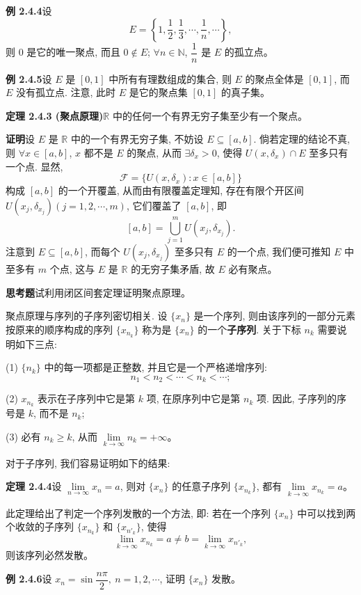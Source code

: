 \documentclass[UTF8, 12pt, fontset=fandol, oneside]{ctexart}
\begin{document}
\noindent\textbf{例 2.4.4}\quad 设
\[
  E=\left\{1,\frac12,\frac13,\cdots,\frac1n,\cdots\right\},
\]
则 $0$ 是它的唯一聚点, 而且 $0\notin E$; $\forall n\in\mathbb{N}$, $\dfrac1n$ 是 $E$ 的孤立点。

\noindent\textbf{例 2.4.5}\quad 设 $E$ 是 $[0,1]$ 中所有有理数组成的集合, 则 $E$ 的聚点全体是 $[0,1]$, 而 $E$ 没有孤立点. 注意, 此时 $E$ 是它的聚点集 $[0,1]$ 的真子集。

\noindent\textbf{定理 2.4.3 (聚点原理)}\quad $\mathbb{R}$ 中的任何一个有界无穷子集至少有一个聚点。

\noindent\textbf{证明}\quad 设 $E$ 是 $\mathbb{R}$ 中的一个有界无穷子集, 不妨设 $E\subseteq[a,b]$. 倘若定理的结论不真, 则 $\forall x\in[a,b]$, $x$ 都不是 $E$ 的聚点, 从而 $\exists\delta_x>0$, 使得 $U(x,\delta_x)\cap E$ 至多只有一个点. 显然,
\[
  \mathcal{F}=\{U(x,\delta_x):x\in[a,b]\}
\]
构成 $[a,b]$ 的一个开覆盖, 从而由有限覆盖定理知, 存在有限个开区间 $U(x_j,\delta_{x_j})(j=1,2,\cdots,m)$, 它们覆盖了 $[a,b]$, 即
\[
  [a,b]=\bigcup_{j=1}^m U(x_j,\delta_{x_j}).
\]
注意到 $E\subseteq[a,b]$, 而每个 $U(x_j,\delta_{x_j})$ 至多只有 $E$ 的一个点, 我们便可推知 $E$ 中至多有 $m$ 个点, 这与 $E$ 是 $\mathbb{R}$ 的无穷子集矛盾, 故 $E$ 必有聚点。

\noindent\textbf{思考题}\quad 试利用闭区间套定理证明聚点原理。

聚点原理与序列的子序列密切相关. 设 $\{x_n\}$ 是一个序列, 则由该序列的一部分元素按原来的顺序构成的序列 $\{x_{n_k}\}$ 称为是 $\{x_n\}$ 的一个\textbf{子序列}. 关于下标 $n_k$ 需要说明如下三点:

(1) $\{n_k\}$ 中的每一项都是正整数, 并且它是一个严格递增序列:
\[
  n_1<n_2<\cdots<n_k<\cdots;
\]

(2) $x_{n_k}$ 表示在子序列中它是第 $k$ 项, 在原序列中它是第 $n_k$ 项. 因此, 子序列的序号是 $k$, 而不是 $n_k$;

(3) 必有 $n_k\geqslant k$, 从而 $\lim\limits_{k\to\infty}n_k=+\infty$。

对于子序列, 我们容易证明如下的结果:

\noindent\textbf{定理 2.4.4}\quad 设 $\lim\limits_{n\to\infty}x_n=a$, 则对 $\{x_n\}$ 的任意子序列 $\{x_{n_k}\}$, 都有 $\lim\limits_{k\to\infty}x_{n_k}=a$。

此定理给出了判定一个序列发散的一个方法, 即: 若在一个序列 $\{x_n\}$ 中可以找到两个收敛的子序列 $\{x_{n_k}\}$ 和 $\{x_{n'_k}\}$, 使得
\[
  \lim_{k\to\infty}x_{n_k}=a\ne b=\lim_{k\to\infty}x_{n'_k},
\]
则该序列必然发散。

\noindent\textbf{例 2.4.6}\quad 设 $x_n=\sin\dfrac{n\pi}{2},\ n=1,2,\cdots$, 证明 $\{x_n\}$ 发散。
\end{document}
